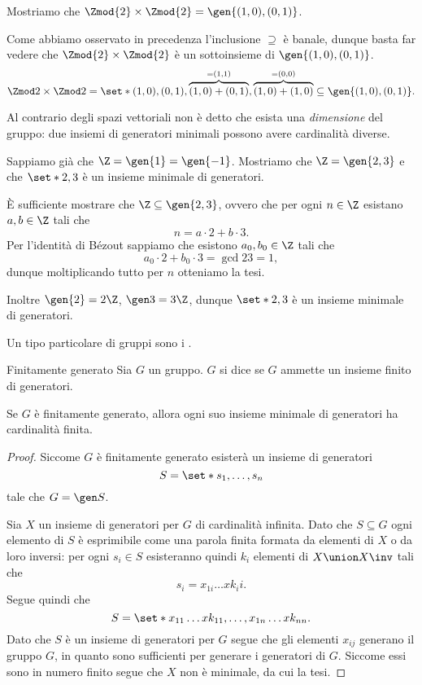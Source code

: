 \begin{example}
    Mostriamo che $\Zmod{2} \times \Zmod{2} = \gen{(1, 0), (0, 1)}$.

    Come abbiamo osservato in precedenza l'inclusione $\supseteq$ è banale, dunque basta far vedere che $\Zmod{2} \times \Zmod{2}$ è un sottoinsieme di $\gen{(1, 0), (0, 1)}$.
    \[
        \Zmod 2 \times \Zmod 2 = \set*{(1, 0), (0, 1), \overbrace{(1, 0) + (0, 1)}^{= (1, 1)}, \overbrace{(1, 0) + (1, 0)}^{= (0, 0)}} \subseteq \gen{(1, 0), (0, 1)}.
    \]
\end{example}

Al contrario degli spazi vettoriali non è detto che esista una \emph{dimensione} del gruppo: due insiemi di generatori minimali possono avere cardinalità diverse.

\begin{example}
    Sappiamo già che $\Z = \gen{1} = \gen{-1}$. Mostriamo che $\Z = \gen{2, 3}$ e che $\set*{2, 3}$ è un insieme minimale di generatori.

    È sufficiente mostrare che $\Z \subseteq \gen{2, 3}$, ovvero che per ogni $n \in \Z$ esistano $a, b \in \Z$ tali che \[
        n = a\cdot 2 + b \cdot 3.    
    \] Per l'identità di Bézout sappiamo che esistono $a_0, b_0 \in \Z$ tali che \[
        a_0\cdot 2 + b_0 \cdot 3 = \gcd{2}{3} = 1,    
    \] dunque moltiplicando tutto per $n$ otteniamo la tesi.

    Inoltre $\gen{2} = 2\Z$, $\gen 3 = 3\Z$, dunque $\set*{2, 3}$ è un insieme minimale di generatori.
\end{example}

Un tipo particolare di gruppi sono i .

\begin{definition}
    {Finitamente generato}{}
    Sia $G$ un gruppo. $G$ si dice  se $G$ ammette un insieme finito di generatori.
\end{definition}

\begin{proposition}{}{}
    Se $G$ è finitamente generato, allora ogni suo insieme minimale di generatori ha cardinalità finita.
\end{proposition}
\begin{proof}
    Siccome $G$ è finitamente generato esisterà un insieme di generatori \[
        S = \set*{s_1, \dots, s_n}    
    \] tale che $G = \gen S$.

    Sia $X$ un insieme di generatori per $G$ di cardinalità infinita. Dato che $S \subseteq G$ ogni elemento di $S$ è esprimibile come una parola finita formata da elementi di $X$ o da loro inversi: per ogni $s_i \in S$ esisteranno quindi $k_i$ elementi di $X \union X\inv$ tali che \[
        s_i = x_{1i}\dots x{k_ii}.
    \] Segue quindi che \[
        S = \set*{x_{11}\dots x{k_{11}}, \dots, x_{1n}\dots x{k_{nn}}}.
    \] Dato che $S$ è un insieme di generatori per $G$ segue che gli elementi $x_{ij}$ generano il gruppo $G$, in quanto sono sufficienti per generare i generatori di $G$. Siccome essi sono in numero finito segue che $X$ non è minimale, da cui la tesi.
\end{proof}

